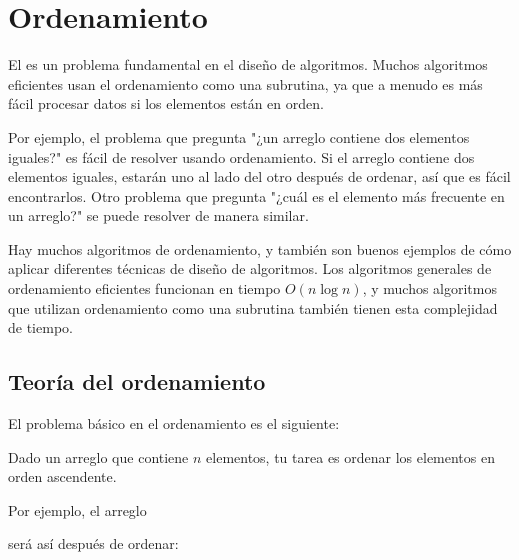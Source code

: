 \chapter{Ordenamiento}


El 
es un problema fundamental en el diseño de algoritmos.
Muchos algoritmos eficientes
usan el ordenamiento como una subrutina,
ya que a menudo es más fácil procesar
datos si los elementos están en orden.

Por ejemplo, el problema que pregunta "¿un arreglo contiene
dos elementos iguales?" es fácil de resolver usando ordenamiento.
Si el arreglo contiene dos elementos iguales,
estarán uno al lado del otro después de ordenar,
así que es fácil encontrarlos.
Otro problema que pregunta "¿cuál es el elemento más frecuente
en un arreglo?" se puede resolver de manera similar.

Hay muchos algoritmos de ordenamiento, y también son
buenos ejemplos de cómo aplicar
diferentes técnicas de diseño de algoritmos.
Los algoritmos generales de ordenamiento eficientes
funcionan en tiempo $O(n \log n)$,
y muchos algoritmos que utilizan ordenamiento
como una subrutina también
tienen esta complejidad de tiempo.

\section{Teoría del ordenamiento}

El problema básico en el ordenamiento es el siguiente:
\begin{framed}
    \noindent
    Dado un arreglo que contiene $n$ elementos,
    tu tarea es ordenar los elementos
    en orden ascendente.
\end{framed}
\noindent
Por ejemplo, el arreglo
\begin{center}
\end{center}
será así después de ordenar:
\begin{center}
\end{center}

